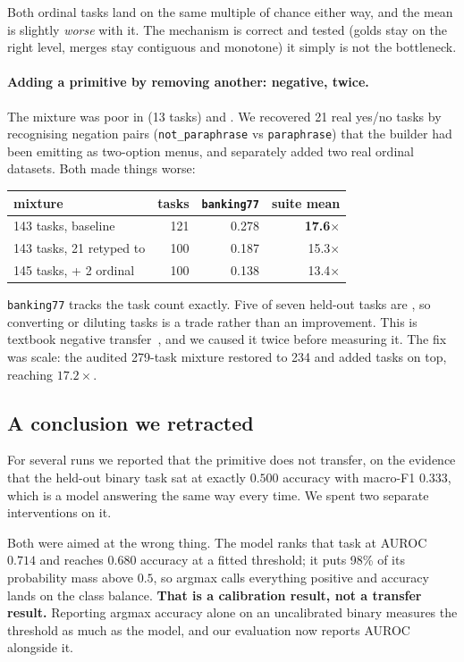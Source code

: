 Both ordinal tasks land on the same multiple of chance either way, and the
mean is slightly \emph{worse} with it. The mechanism is correct and tested
(golds stay on the right level, merges stay contiguous and monotone)
it simply is not the bottleneck.

\paragraph{Adding a primitive by removing another: negative, twice.}
The mixture was poor in \noul{} (13 tasks) and \score{}. We recovered 21
real yes/no tasks by recognising negation pairs (\texttt{not\_paraphrase}
vs \texttt{paraphrase}) that the builder had been emitting as two-option
menus, and separately added two real ordinal datasets. Both made things
worse:

\begin{center}
\begin{tabular}{lrrr}
\toprule
mixture & \choice{} tasks & \texttt{banking77} & suite mean \\
\midrule
143 tasks, baseline          & 121 & 0.278 & \textbf{17.6$\times$} \\
143 tasks, 21 retyped to \noul{} & 100 & 0.187 & 15.3$\times$ \\
145 tasks, + 2 ordinal       & 100 & 0.138 & 13.4$\times$ \\
\bottomrule
\end{tabular}
\end{center}

\texttt{banking77} tracks the \choice{} task count exactly. Five of seven
held-out tasks are \choice{}, so converting or diluting \choice{} tasks is
a trade rather than an improvement. This is textbook negative
transfer~\cite{stilts}, and we caused it twice before measuring it. The
fix was scale: the audited 279-task mixture restored \choice{} to 234 and
added tasks on top, reaching $17.2\times$.

\subsection{A conclusion we retracted}

For several runs we reported that the \noul{} primitive does not transfer,
on the evidence that the held-out binary task sat at exactly $0.500$
accuracy with macro-F1 $0.333$, which is a model answering the same way every
time. We spent two separate interventions on it.

Both were aimed at the wrong thing. The model ranks that task at AUROC
$0.714$ and reaches $0.680$ accuracy at a fitted threshold; it puts 98\% of
its probability mass above $0.5$, so argmax calls everything positive and
accuracy lands on the class balance. \textbf{That is a calibration result,
not a transfer result.} Reporting argmax accuracy alone on an uncalibrated
binary measures the threshold as much as the model, and our evaluation now
reports AUROC alongside it.

